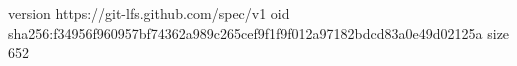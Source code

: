 version https://git-lfs.github.com/spec/v1
oid sha256:f34956f960957bf74362a989c265cef9f1f9f012a97182bdcd83a0e49d02125a
size 652
